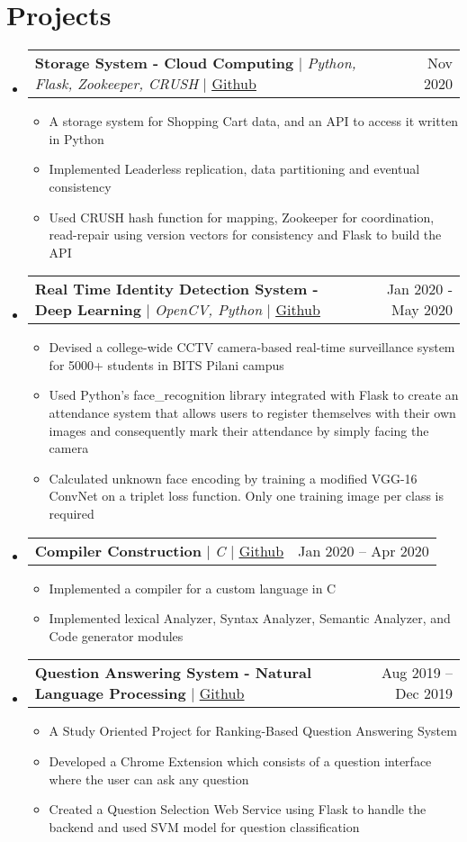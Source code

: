 \documentclass[res,10pt]{article}
\makeatletter
\newcommand{\resumeItem}[1]{
  \item\small{
    {#1 \vspace{-2pt}}
  }
}
\newcommand{\resumeProjectHeading}[2]{
    \item
    \begin{tabular*}{0.97\textwidth}{l@{\extracolsep{\fill}}r}
      \small#1 & #2 \\
    \end{tabular*}\vspace{-7pt}
}
\newcommand{\resumeSubHeadingListStart}{\begin{itemize}[leftmargin=0.15in, label={}]}
\newcommand{\resumeSubHeadingListEnd}{\end{itemize}}
\newcommand{\resumeItemListStart}{\begin{itemize}}
\newcommand{\resumeItemListEnd}{\end{itemize}\vspace{-5pt}}
\makeatother
\begin{document}
\section{Projects}
    \resumeSubHeadingListStart
      \resumeProjectHeading
          {\textbf{Storage System - Cloud Computing} $|$ \emph{Python, Flask, Zookeeper, CRUSH} $|$ \href{https://github.com/vismit2000/ShoppingCart-Cloud}{\underline{Github}}}{Nov 2020}
          \resumeItemListStart
            \resumeItem{A storage system for Shopping Cart data, and an API to access it written in Python}
            \resumeItem{Implemented Leaderless replication, data partitioning and eventual consistency}
            \resumeItem{Used CRUSH hash function for mapping, Zookeeper for coordination, read-repair using version vectors for consistency and Flask to build the API}
          \resumeItemListEnd
      \resumeProjectHeading
          {\textbf{Real Time Identity Detection System - Deep Learning} $|$ \emph{OpenCV, Python} $|$ \href{https://github.com/vismit2000/face-recognition-attendance-system}{\underline{Github}}}{Jan 2020 - May 2020}
          \resumeItemListStart
            \resumeItem{Devised a college-wide CCTV camera-based real-time surveillance system for 5000+ students in BITS Pilani campus}
            \resumeItem{Used Python's face\_recognition library integrated with Flask to create an attendance system that allows users to register themselves with their own images and consequently mark their attendance by simply facing the camera}
            \resumeItem{Calculated unknown face encoding by training a modified VGG-16 ConvNet on a triplet loss function. Only one training image per class is required}
          \resumeItemListEnd
      \resumeProjectHeading
          {\textbf{Compiler Construction} $|$ \emph{C} $|$ \href{https://github.com/vismit2000/Compiler-Construction}{\underline{Github}}}{Jan 2020 -- Apr 2020}
          \resumeItemListStart
            \resumeItem{Implemented a compiler for a custom language in C}
            \resumeItem{Implemented lexical Analyzer, Syntax Analyzer, Semantic Analyzer, and Code generator modules}
          \resumeItemListEnd
      \resumeProjectHeading
          {\textbf{Question Answering System - Natural Language Processing} $|$ \href{https://github.com/vismit2000/Ranking-Based-Question-Answering-System}{\underline{Github}}}{Aug 2019 -- Dec 2019}
          \resumeItemListStart
            \resumeItem{A Study Oriented Project for Ranking-Based Question Answering System}
            \resumeItem{Developed a Chrome Extension which consists of a question interface where the user can ask any question}
            \resumeItem{Created a Question Selection Web Service using Flask to handle the backend and used SVM model for question classification}
          \resumeItemListEnd
    \resumeSubHeadingListEnd
\end{document}
